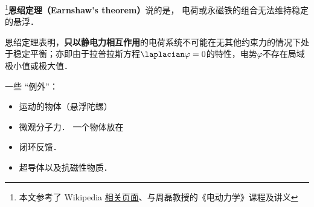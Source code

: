 
\begin{issues}
\issueDraft
\end{issues}

\footnote{本文参考了 Wikipedia \href{https://en.wikipedia.org/wiki/Earnshaw's_theorem}{相关页面}、\cite{GriffE}与周磊教授的《电动力学》课程及讲义}\textbf{恩绍定理（Earnshaw's theorem）}说的是， 电荷或永磁铁的组合无法维持稳定的悬浮．

恩绍定理表明，\textbf{只以静电力相互作用}的电荷系统不可能在无其他约束力的情况下处于稳定平衡；亦即由于拉普拉斯方程$\laplacian \varphi = 0$的特性，电势$\varphi$不存在局域极小值或极大值．

一些 “例外”：
\begin{itemize}
\item 运动的物体（悬浮陀螺）
\item 微观分子力． 一个物体放在
\item 闭环反馈．
\item 超导体以及抗磁性物质．
\end{itemize}
